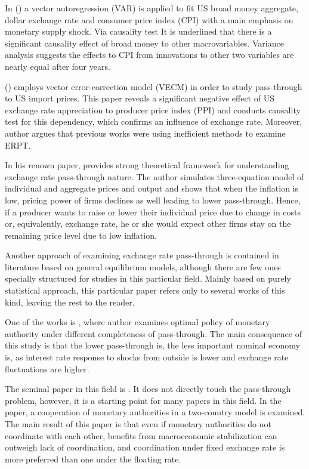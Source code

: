 \documentclass[12pt, a4paper]{extarticle}
\begin{document}
In (\cite{Deravi1995}) a vector autoregression (VAR) is applied to fit US broad money aggregate, dollar exchange rate and consumer price index (CPI) with a main emphasis on monetary supply shock. Via causality test It is underlined that there is a significant causality effect of broad money to other macrovariables. Variance analysis suggests the effects to CPI from innovations to other two variables are nearly equal after four years.
 
(\cite{Kim1998}) employs vector error-correction model (VECM) in order to study pass-through to US import prices. This paper reveals a significant negative effect of US exchange rate appreciation to producer price index (PPI) and conducts causality test for this dependency, which confirms an influence of exchange rate. Moreover, author argues that previous works were using inefficient methods to examine ERPT. 

In his renown paper, \textcite{Taylor2000} provides strong theoretical framework for understanding exchange rate pass-through nature. The author simulates three-equation model of individual and aggregate prices and output and shows that when the inflation is low, pricing power of firms declines as well leading to lower pass-through. Hence, if a producer wants to raise or lower their individual price due to change in costs or, equivalently, exchange rate, he or she would expect other firms stay on the remaining price level due to low inflation.
 
Another approach of examining exchange rate pass-through is contained in literature based on general equilibrium models, although there are few ones specially structured for studies in this particular field. Mainly based on purely statistical approach, this particular paper refers only to several works of this kind, leaving the rest to the reader.

One of the works is \cite{Adolfson2001}, where author examines optimal policy of monetary authority under different completeness of pass-through. The main consequence of this study is that the lower pass-through is, the less important nominal economy is, as interest rate response to shocks from outside is lower and exchange rate fluctuations are higher.

The seminal paper in this field is \cite{Obstfeld2002}. It does not directly touch the pass-through problem, however, it is a starting point for many papers in this field. In the paper, a cooperation of monetary authorities in a two-country model is examined. The main result of this paper is that even if monetary authorities do not coordinate with each other, benefits from macroeconomic stabilization can outweigh lack of coordination, and coordination under fixed exchange rate is more preferred than one under the floating rate.
\end{document}

